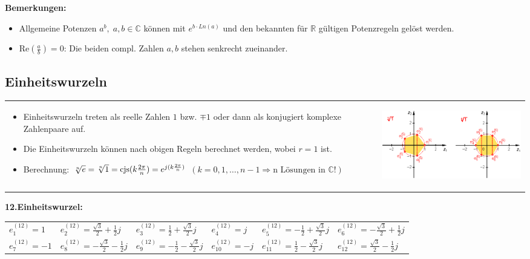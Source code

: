 \textbf{Bemerkungen:}
\begin{itemize}
    \item Allgemeine Potenzen $a^b,\;a,b \in \mathbb{C}$ können mit $e^{b \cdot 
    	Ln(a)}$ und den bekannten für $\mathbb{R}$ gültigen Potenzregeln gelöst
    	werden.
    \item Re$\left (\frac{a}{b} \right) = 0$: Die beiden compl. Zahlen $a, b$
    	stehen senkrecht zueinander.
\end{itemize}


\subsection{Einheitswurzeln}
\begin{tabular}{p{10cm}p{8cm}}
\begin{itemize}
  \item Einheitswurzeln treten als reelle Zahlen $1$ bzw. $\mp 1$ oder dann als
  konjugiert komplexe Zahlenpaare auf.
  \item Die Einheitswurzeln können nach obigen Regeln berechnet werden, wobei $r
  = 1$ ist. 
  \item Berechnung: 
  		$ \sqrt[n]{e} = \sqrt[n]{1} = \operatorname{cjs}(k \frac{2\pi}{n}) 
		  = e^{j(k \frac{2\pi}{n})} $  \newline
		$  (k = 0, 1, \ldots, n-1 \Rightarrow \text{n Lösungen in } \mathbb{C} !)$
\end{itemize} 
&
\begin{center}
\includegraphics[width=7cm]{./bilder/einheitswurzel.png}
\end{center} \\
\end{tabular}

\textbf{12.Einheitswurzel:} \\
\begin{tabular}{llllll}
	$e^{(12)}_1 = 1$ & $e^{(12)}_2 = \frac{\sqrt3}{2} + \frac12j$ & $e^{(12)}_3 =
	\frac12 + \frac{\sqrt3}{2}j$ & $e^{(12)}_4 = j$ & $e^{(12)}_5 = -\frac12 +
	\frac{\sqrt3}{2}j$ & $e^{(12)}_6 = -\frac{\sqrt3}{2} + \frac12 j$ \\
	$e^{(12)}_7 = -1$ & $e^{(12)}_8 = -\frac{\sqrt3}{2} - \frac12 j$ &
	$e^{(12)}_9 = -\frac12 - \frac{\sqrt3}{2}j$ & $e^{(12)}_{10} = -j$ &
	$e^{(12)}_{11} = \frac12 - \frac{\sqrt3}{2}j$ & $e^{(12)}_{12} =
	\frac{\sqrt3}{2} - \frac12j$ \\
\end{tabular}



